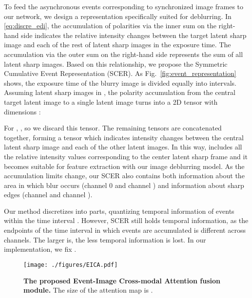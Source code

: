 \documentclass[runningheads]{llncs}
\newlength \g
\begin{document}
To feed the asynchronous events corresponding to synchronized image frames to our network, we design a representation specifically suited for deblurring. In \eqref{eq:discre_edi}, the accumulation of polarities via the inner sum on the right-hand side indicates the relative intensity changes between the target latent sharp image  and each of the rest of latent sharp images in the exposure time. The accumulation via the outer sum on the right-hand side represents the sum of all latent sharp images. Based on this relationship, we propose the Symmetric Cumulative Event Representation (SCER). As Fig.~\ref{fig:event_representation} shows, the exposure time  of the blurry image is divided equally into  intervals. Assuming  latent sharp images in , the polarity accumulation from the central target latent image  to a single latent image turns into a 2D tensor with dimensions :


For , , so we discard this tensor. The remaining  tensors are concatenated together, forming a tensor which indicates intensity changes between the central latent sharp image  and each of the  other latent images. In this way,  includes all the relative intensity values corresponding to the center latent sharp frame and it becomes suitable for feature extraction with our image deblurring model. As the accumulation limits change, our SCER also contains both information about the area in which blur occurs (channel 0 and channel ) and information about sharp edges (channel  and channel ).

Our method discretizes  into  parts, quantizing temporal information of events within the time interval . However, SCER still holds temporal information, as the endpoints of the time interval in which events are accumulated is different across channels. The larger  is, the less temporal information is lost. In our implementation, we fix .



\begin{wrapfigure}{l}{0.5\textwidth}
  \vspace{-30pt}
  \begin{center}
   \texttt{[image: ./figures/EICA.pdf]}
  \end{center}
  \vspace{-10pt}
  \caption{\textbf{The proposed Event-Image Cross-modal Attention fusion module.} The size of the attention map is .}
  \vspace{-20pt}
  \label{fig:EICA}
\end{wrapfigure}
\end{document}
